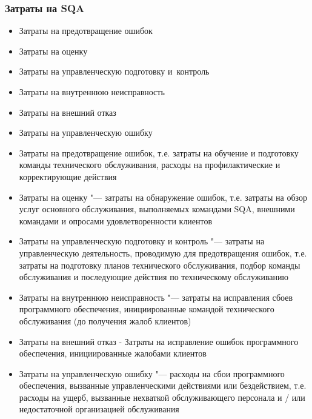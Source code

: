 \documentclass{../industrial-development}
\begin{document}
\begin{frame} \frametitle{Затраты на SQA}
 	 \begin{itemize}
\item Затраты на предотвращение ошибок
\item Затраты на оценку 
\item Затраты на управленческую подготовку и~контроль
\item Затраты на внутреннюю неисправность
\item Затраты на внешний отказ
\item Затраты на управленческую ошибку
  	\end{itemize}
\end{frame}

\lecturenotes

 	 \begin{itemize}
\item Затраты на предотвращение ошибок, т.е. затраты на обучение и подготовку команды технического обслуживания, расходы на профилактические и корректирующие действия
\item Затраты на оценку "--- затраты на обнаружение ошибок, т.е. затраты на обзор услуг основного обслуживания, выполняемых командами SQA, внешними командами и опросами удовлетворенности клиентов
\item Затраты на управленческую подготовку и контроль "--- затраты на управленческую деятельность, проводимую для предотвращения ошибок, т.е. затраты на подготовку планов технического обслуживания, подбор команды обслуживания и последующие действия по техническому обслуживанию
\item Затраты на внутреннюю неисправность "--- затраты на исправления сбоев программного обеспечения, инициированные командой технического обслуживания (до получения жалоб клиентов)
\item Затраты на внешний отказ - Затраты на исправление ошибок программного обеспечения, инициированные жалобами клиентов
\item Затраты на управленческую ошибку "--- расходы на сбои программного обеспечения, вызванные управленческими действиями или бездействием, т.е. расходы на ущерб, вызванные нехваткой обслуживающего персонала и / или недостаточной организацией обслуживания~\cite[с.~272]{SQA-Galin}
  	\end{itemize}
\end{document}

